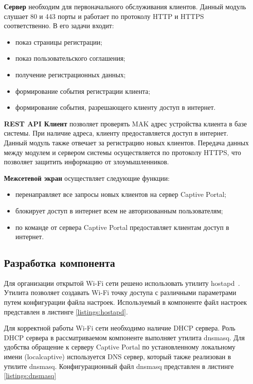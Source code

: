 \textbf{Сервер} необходим для первоначального обслуживания клиентов. Данный модуль слушает 80 и 443 порты и работает по протоколу HTTP и HTTPS соответственно. В его задачи входит:

\begin{itemize}
	\item показ страницы регистрации;
	\item показ пользовательского соглашения;
	\item получение регистрационных данных;
	\item формирование события регистрации клиента;
	\item формирование события, разрешающего клиенту доступ в интернет.
\end{itemize}

\textbf{REST API Клиент} позволяет проверять MAK адрес устройства клиента в базе системы. При наличие адреса, клиенту предоставляется доступ в интернет. Данный модуль также отвечает за регистрацию новых клиентов. Передача данных между модулем и сервером системы осуществляется по протоколу HTTPS, что позволяет защитить информацию от злоумышленников.

\textbf{Межсетевой экран} осуществляет следующие функции:
\begin{itemize}
	\item перенаправляет все запросы новых клиентов на сервер Captive Portal;
	\item блокирует доступ в интернет всем не авторизованным пользователям;
	\item по команде от сервера Captive Portal предоставляет клиентам доступ в интернет.
\end{itemize}{}

\subsection{Разработка компонента}

Для организации открытой Wi-Fi сети решено использовать утилиту hostapd~\cite{hostapd}. Утилита позволяет создавать Wi-Fi точку доступа с различными параметрами путем конфигурации файла настроек. Используемый в компоненте файл настроек представлен в листинге \ref{listings:hostapd}.

Для корректной работы Wi-Fi сети необходимо наличие DHCP сервера. Роль DHCP сервера в рассматриваемом компоненте выполняет утилита dnsmasq. Для удобства обращение к серверу Captive Portal по установленному локальному имени (localcaptive) используется DNS сервер, который также реализован в утилите dnsmasq. Конфигурационный файл dnsmasq представлен в листинге \ref{listings:dnsmasq}

